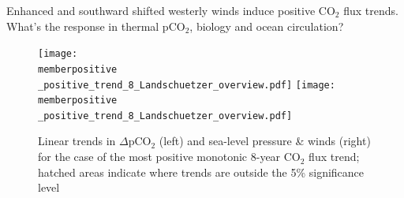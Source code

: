 \documentclass[aspectratio=169]{beamer}
\newcommand{\memberpositive}{m178_1985_1992} %
\begin{document}
	
	
\begin{frame}{Enhanced and southward shifted westerly winds induce positive CO$_2$ flux trends. What's the response in thermal pCO$_2$, biology and ocean circulation?} %
\vspace{-1mm}
\begin{figure}[h!]
\centering
	\texttt{[image: \\memberpositive \_positive\_trend\_8\_Landschuetzer\_overview.pdf]}
	\texttt{[image: \\memberpositive \_positive\_trend\_8\_Landschuetzer\_overview.pdf]}	
	\caption{Linear trends in $\Delta$pCO$_2$ (left) and sea-level pressure \& winds (right) for the case of the most positive monotonic 8-year CO$_2$ flux trend; hatched areas indicate where trends are outside the 5\% significance level}%
	\label{fig:pco2_pos}
\end{figure}

\end{frame}
\end{document}
